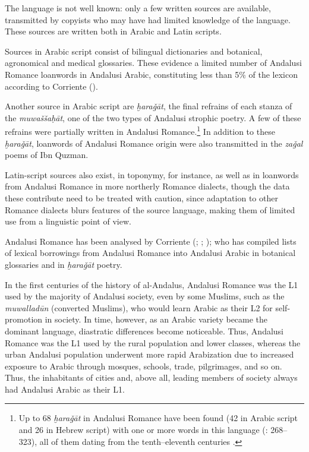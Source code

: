 \documentclass[output=paper,modfonts,nonflat]{langsci/langscibook}
\begin{document}
The language is not well known: only a few written sources are available, transmitted by copyists who may have had limited knowledge of the language. These sources are written both in Arabic and Latin scripts. 

Sources in Arabic script consist of bilingual dictionaries and botanical, agronomical and medical glossaries. These evidence a limited number of Andalusi Romance loanwords in Andalusi Arabic, constituting less than 5\% of the lexicon according to Corriente (\citeyear[142]{Corriente1992book}).

Another source in Arabic script are \textit{ḫaraǧāt}, the final refrains of each stanza of the \textit{muwaššaḥāt}, one of the two types of Andalusi strophic poetry. A few of these refrains were partially written in Andalusi Romance.\footnote{Up to 68 \textit{ḫaraǧāt} in Andalusi Romance have been found (42 in Arabic script and 26 in Hebrew script) with one or more words in this language (\citealt{Corriente1997poetry}: 268–323), all of them dating from the tenth--eleventh centuries \citep[343]{Corriente1997poetry}.} In addition to these \textit{ḫaraǧāt}, loanwords of Andalusi Romance origin were also transmitted in the \textit{zaǧal} poems of Ibn Quzman. 

Latin-script sources also exist, in toponymy, for instance, as well as in loanwords from Andalusi Romance in more northerly Romance dialects, though the data these contribute need to be treated with caution, since adaptation to other Romance dialects blurs features of the source language, making them of limited use from a linguistic point of view. 

Andalusi Romance has been analysed by Corriente (\citeyear{Corriente1995}; \citeyear{Corriente2000}; \citeyear{Corriente2012}); who has compiled lists of lexical borrowings from Andalusi Romance into Andalusi Arabic in botanical glossaries and in \textit{ḫaraǧāt} poetry.  

In the first centuries of the history of al-Andalus, Andalusi Romance was the L1 used by the majority of Andalusi society, even by some Muslims, such as the \textit{muwalladūn} (converted Muslims), who would learn Arabic as their L2 for self-promotion in society. In time, however, as an Arabic variety became the dominant language, diastratic differences become noticeable. Thus, Andalusi Romance was the L1 used by the rural population and lower classes, whereas the urban Andalusi population underwent more rapid Arabization due to increased exposure to Arabic through mosques, schools, trade, pilgrimages, and so on. Thus, the inhabitants of cities and, above all, leading members of society always had Andalusi Arabic as their L1. 
\end{document}
